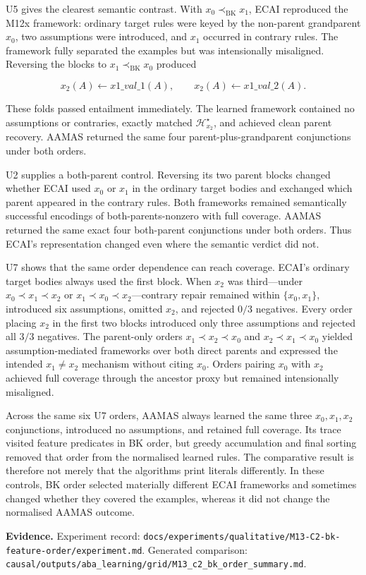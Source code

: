 \documentclass[11pt]{article}
\begin{document}
U5 gives the clearest semantic contrast. With \(x_0\prec_{\mathrm{BK}}x_1\), ECAI reproduced the M12x framework: ordinary target rules were keyed by the non-parent grandparent \(x_0\), two assumptions were introduced, and \(x_1\) occurred in contrary rules. The framework fully separated the examples but was intensionally misaligned. Reversing the blocks to \(x_1\prec_{\mathrm{BK}}x_0\) produced

\[ x_2(A)\leftarrow x1\_val\_1(A), \qquad x_2(A)\leftarrow x1\_val\_2(A). \]

These folds passed entailment immediately. The learned framework contained no assumptions or contraries, exactly matched \(\mathcal{H}_{x_2}^\star\), and achieved clean parent recovery. AAMAS returned the same four parent-plus-grandparent conjunctions under both orders.

U2 supplies a both-parent control. Reversing its two parent blocks changed whether ECAI used \(x_0\) or \(x_1\) in the ordinary target bodies and exchanged which parent appeared in the contrary rules. Both frameworks remained semantically successful encodings of both-parents-nonzero with full coverage. AAMAS returned the same exact four both-parent conjunctions under both orders. Thus ECAI's representation changed even where the semantic verdict did not.

U7 shows that the same order dependence can reach coverage. ECAI's ordinary target bodies always used the first block. When \(x_2\) was third---under \(x_0\prec x_1\prec x_2\) or \(x_1\prec x_0\prec x_2\)---contrary repair remained within \(\{x_0,x_1\}\), introduced six assumptions, omitted \(x_2\), and rejected \(0/3\) negatives. Every order placing \(x_2\) in the first two blocks introduced only three assumptions and rejected all \(3/3\) negatives. The parent-only orders \(x_1\prec x_2\prec x_0\) and \(x_2\prec x_1\prec x_0\) yielded assumption-mediated frameworks over both direct parents and expressed the intended \(x_1\neq x_2\) mechanism without citing \(x_0\). Orders pairing \(x_0\) with \(x_2\) achieved full coverage through the ancestor proxy but remained intensionally misaligned.

Across the same six U7 orders, AAMAS always learned the same three \(x_0,x_1,x_2\) conjunctions, introduced no assumptions, and retained full coverage. Its trace visited feature predicates in BK order, but greedy accumulation and final sorting removed that order from the normalised learned rules. The comparative result is therefore not merely that the algorithms print literals differently. In these controls, BK order selected materially different ECAI frameworks and sometimes changed whether they covered the examples, whereas it did not change the normalised AAMAS outcome.

\textbf{Evidence.} Experiment record: \texttt{docs/experiments/qualitative/M13-C2-bk-feature-order/experiment.md}. Generated comparison: \texttt{causal/outputs/aba\_learning/grid/M13\_c2\_bk\_order\_summary.md}.
\end{document}
